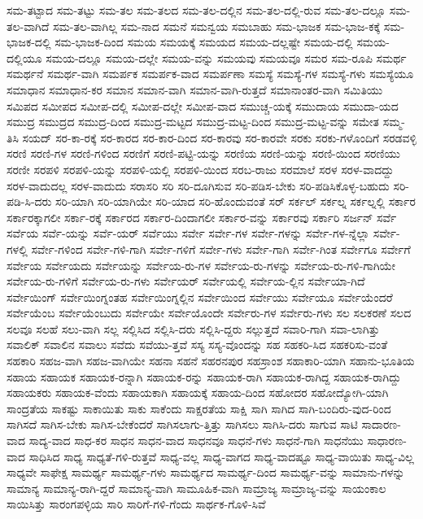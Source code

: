 {ಸಮ-ತಟ್ಟಾದ
ಸಮ-ತಟ್ಟು
ಸಮ-ತಲ
ಸಮ-ತಲದ
ಸಮ-ತಲ-ದಲ್ಲಿನ
ಸಮ-ತಲ-ದಲ್ಲಿ-ರುವ
ಸಮ-ತಲ-ದಲ್ಲೂ
ಸಮ-ತಲ-ವಾಗಿದೆ
ಸಮ-ತಲ-ವಾಗಿಲ್ಲ
ಸಮ-ನಾದ
ಸಮನೆ
ಸಮನ್ವಯ
ಸಮಬಾಹು
ಸಮ-ಭಾಜಕ
ಸಮ-ಭಾಜ-ಕಕ್ಕೆ
ಸಮ-ಭಾಜಕ-ದಲ್ಲಿ
ಸಮ-ಭಾಜಕ-ದಿಂದ
ಸಮಯ
ಸಮಯಕ್ಕೆ
ಸಮಯದ
ಸಮಯ-ದಲ್ಲಷ್ಟೇ
ಸಮಯ-ದಲ್ಲಿ
ಸಮಯ-ದಲ್ಲಿಯೂ
ಸಮಯ-ದಲ್ಲೂ
ಸಮಯ-ದಲ್ಲೇ
ಸಮಯ-ವನ್ನು
ಸಮಯವು
ಸಮಯವೂ
ಸಮರ
ಸಮ-ರೂಪಿ
ಸಮರ್ಥ
ಸಮರ್ಥನೆ
ಸಮರ್ಥ-ವಾಗಿ
ಸಮರ್ಪಕ
ಸಮರ್ಪಕ-ವಾದ
ಸಮರ್ಪಣಾ
ಸಮಸ್ಯೆ
ಸಮಸ್ಯೆ-ಗಳ
ಸಮಸ್ಯೆ-ಗಳು
ಸಮಸ್ಯೆಯೂ
ಸಮಾಧಾನ
ಸಮಾಧಾನ-ಕರ
ಸಮಾನ
ಸಮಾನ-ವಾಗಿ
ಸಮಾನ-ವಾಗಿ-ರುತ್ತದೆ
ಸಮಾನಾಂತರ-ವಾಗಿ
ಸಮಿತಿಯು
ಸಮಿಪದ
ಸಮೀಪದ
ಸಮೀಪ-ದಲ್ಲಿ
ಸಮೀಪ-ದಲ್ಲೇ
ಸಮೀಪ-ವಾದ
ಸಮುಚ್ಚ-ಯಕ್ಕೆ
ಸಮುದಾಯ
ಸಮುದಾ-ಯದ
ಸಮುದ್ರ
ಸಮುದ್ರದ
ಸಮುದ್ರ-ದಿಂದ
ಸಮುದ್ರ-ಮಟ್ಟದ
ಸಮುದ್ರ-ಮಟ್ಟ-ದಿಂದ
ಸಮುದ್ರ-ಮಟ್ಟ-ವನ್ನು
ಸಮೇತ
ಸಮ್ಮ-ತಿಸಿ
ಸಯದ್
ಸರ-ಕಾ-ರಕ್ಕೆ
ಸರ-ಕಾರದ
ಸರ-ಕಾರ-ದಿಂದ
ಸರ-ಕಾರವು
ಸರ-ಕಾರವೇ
ಸರಕು
ಸರಕು-ಗಳೊಂದಿಗೆ
ಸರಡವಳ್ಳಿ
ಸರಣಿ
ಸರಣಿ-ಗಳ
ಸರಣಿ-ಗಳಿಂದ
ಸರಣಿಗೆ
ಸರಣಿ-ಪಟ್ಟಿ-ಯನ್ನು
ಸರಣಿಯ
ಸರಣಿ-ಯನ್ನು
ಸರಣಿ-ಯಿಂದ
ಸರಣಿಯು
ಸರಣೀ
ಸರಪಳಿ
ಸರಪಳಿ-ಯನ್ನು
ಸರಪಳಿ-ಯಲ್ಲಿ
ಸರಪಳಿ-ಯಿಂದ
ಸರಬ-ರಾಜು
ಸರಮಾಲೆ
ಸರಳ
ಸರಳ-ವಾದದ್ದು
ಸರಳ-ವಾದುದಲ್ಲ
ಸರಳ-ವಾದುದು
ಸರಾಸರಿ
ಸರಿ
ಸರಿ-ದೂಗಿಸುವ
ಸರಿ-ಪಡಿಸ-ಬೇಕು
ಸರಿ-ಪಡಿಸಿಕೊಳ್ಳ-ಬಹುದು
ಸರಿ-ಪಡಿ-ಸಿ-ದರು
ಸರಿ-ಯಾಗಿ
ಸರಿ-ಯಾಗಿಯೇ
ಸರಿ-ಯಾದ
ಸರಿ-ಹೊಂದುವಂತೆ
ಸರ್
ಸರ್ಕಲ್
ಸರ್ಕಲ್ನ
ಸರ್ಕಲ್ನಲ್ಲಿ
ಸರ್ಕಾರ
ಸರ್ಕಾರಕ್ಕಾಗಲೀ
ಸರ್ಕಾ-ರಕ್ಕೆ
ಸರ್ಕಾರದ
ಸರ್ಕಾರ-ದಿಂದಾಗಲೀ
ಸರ್ಕಾರ-ವನ್ನು
ಸರ್ಕಾರವು
ಸರ್ಕಾರಿ
ಸರ್ಜನ್
ಸರ್ವೆ
ಸರ್ವೆಯ
ಸರ್ವೆ-ಯನ್ನು
ಸರ್ವೆ-ಯರ್
ಸರ್ವೆಯು
ಸರ್ವೇ
ಸರ್ವೇ-ಗಳ
ಸರ್ವೇ-ಗಳನ್ನು
ಸರ್ವೇ-ಗಳ-ನ್ನೆಲ್ಲಾ
ಸರ್ವೇ-ಗಳಲ್ಲಿ
ಸರ್ವೇ-ಗಳಿಂದ
ಸರ್ವೇ-ಗಳಿ-ಗಾಗಿ
ಸರ್ವೇ-ಗಳಿಗೆ
ಸರ್ವೇ-ಗಳು
ಸರ್ವೇ-ಗಾಗಿ
ಸರ್ವೇ-ಗಿಂತ
ಸರ್ವೇಗೂ
ಸರ್ವೇಗೆ
ಸರ್ವೇಯ
ಸರ್ವೇಯದು
ಸರ್ವೇಯನ್ನು
ಸರ್ವೇಯ-ರು-ಗಳ
ಸರ್ವೇಯ-ರು-ಗಳನ್ನು
ಸರ್ವೇಯ-ರು-ಗಳಿ-ಗಾಗಿಯೇ
ಸರ್ವೇಯ-ರು-ಗಳಿಗೆ
ಸರ್ವೇಯ-ರು-ಗಳು
ಸರ್ವೇಯರ್
ಸರ್ವೇಯಲ್ಲಿ
ಸರ್ವೇಯ-ಲ್ಲಿನ
ಸರ್ವೇಯಾ-ಗಿದೆ
ಸರ್ವೇಯಿಂಗ್
ಸರ್ವೇಯಿಂಗ್ನಂತಹ
ಸರ್ವೇಯಿಂಗ್ನಲ್ಲಿನ
ಸರ್ವೇಯಿಂದ
ಸರ್ವೇಯು
ಸರ್ವೇಯೂ
ಸರ್ವೇಯೆಂದರೆ
ಸರ್ವೇಯೆಂಬ
ಸರ್ವೇಯೆಂಬುದು
ಸರ್ವೇಯೇ
ಸರ್ವೇಯೊಂದೇ
ಸರ್ವೇರು-ಗಳ
ಸರ್ವೇರು-ಗಳು
ಸಲ
ಸಲಕರಣೆ
ಸಲದ
ಸಲವೂ
ಸಲಹೆ
ಸಲು-ವಾಗಿ
ಸಲ್ಲ
ಸಲ್ಲಿಸಿದ
ಸಲ್ಲಿಸಿ-ದರು
ಸಲ್ಲಿಸಿ-ದ್ದರು
ಸಲ್ಲುತ್ತದೆ
ಸವಾರಿ-ಗಾಗಿ
ಸವಾ-ಲಾಗಿತ್ತು
ಸವಾಲಿಕ್
ಸವಾಲಿನ
ಸವಾಲು
ಸವೆದು
ಸವೆಯು-ತ್ತವೆ
ಸಸ್ಯ
ಸಸ್ಯ-ವೊಂದನ್ನು
ಸಹ
ಸಹಕರಿ-ಸಿದ
ಸಹಕರಿಸು-ವಂತೆ
ಸಹಕಾರಿ
ಸಹಜ-ವಾಗಿ
ಸಹಜ-ವಾಗಿಯೇ
ಸಹನಾ
ಸಹನೆ
ಸಹರನಪುರ
ಸಹಸ್ರಾಂಶ
ಸಹಾಕಾರಿ-ಯಾಗಿ
ಸಹಾನು-ಭೂತಿಯ
ಸಹಾಯ
ಸಹಾಯಕ
ಸಹಾಯಕ-ರನ್ನಾಗಿ
ಸಹಾಯಕ-ರನ್ನು
ಸಹಾಯಕ-ರಾಗಿ
ಸಹಾಯಕ-ರಾಗಿದ್ದ
ಸಹಾಯಕ-ರಾಗಿದ್ದು
ಸಹಾಯಕರು
ಸಹಾಯಕ-ವೆಂದು
ಸಹಾಯಕಾಗಿ
ಸಹಾಯಕ್ಕೆ
ಸಹಾಯ-ದಿಂದ
ಸಹೋದರ
ಸಹೋದ್ಯೋಗಿ-ಯಾಗಿ
ಸಾಂದ್ರತೆಯ
ಸಾಕಷ್ಟು
ಸಾಕಾಯಿತು
ಸಾಕು
ಸಾಕೆಂದು
ಸಾಕ್ಷರತೆಯ
ಸಾಕ್ಷಿ
ಸಾಗಿ
ಸಾಗಿದ
ಸಾಗಿ-ಬಂದಿರು-ವುದ-ರಿಂದ
ಸಾಗಿಸದೆ
ಸಾಗಿಸ-ಬೇಕು
ಸಾಗಿಸ-ಬೇಕೆಂದರೆ
ಸಾಗಿಸಲಾಗು-ತ್ತಿತ್ತು
ಸಾಗಿಸಲು
ಸಾಗಿಸಿ-ದರು
ಸಾಗುವ
ಸಾಟಿ
ಸಾದಾರಣ-ವಾದ
ಸಾದ್ಯ-ವಾದ
ಸಾಧ-ಕರ
ಸಾಧನ
ಸಾಧನ-ವಾದ
ಸಾಧನವೂ
ಸಾಧನೆ-ಗಳು
ಸಾಧನೆ-ಗಾಗಿ
ಸಾಧನೆಯು
ಸಾಧಾರಣ-ವಾದ
ಸಾಧಿಸಿದ
ಸಾಧ್ಯ
ಸಾಧ್ಯತೆ-ಗಳಿ-ರುತ್ತವೆ
ಸಾಧ್ಯ-ವಲ್ಲ
ಸಾಧ್ಯ-ವಾಗದ
ಸಾಧ್ಯ-ವಾದಷ್ಟೂ
ಸಾಧ್ಯ-ವಾಯಿತು
ಸಾಧ್ಯ-ವಿಲ್ಲ
ಸಾಧ್ಯವೇ
ಸಾಫೇಕ್ಷ
ಸಾಮರ್ಥ್ಯ
ಸಾಮರ್ಥ್ಯ-ಗಳು
ಸಾಮರ್ಥ್ಯದ
ಸಾಮರ್ಥ್ಯ-ದಿಂದ
ಸಾಮರ್ಥ್ಯ-ವನ್ನು
ಸಾಮಾನು-ಗಳನ್ನು
ಸಾಮಾನ್ಯ
ಸಾಮಾನ್ಯ-ರಾಗಿ-ದ್ದರೆ
ಸಾಮಾನ್ಯ-ವಾಗಿ
ಸಾಮೂಹಿಕ-ವಾಗಿ
ಸಾಮ್ರಾಜ್ಯ
ಸಾಮ್ರಾಜ್ಯ-ವನ್ನು
ಸಾಯಂಕಾಲ
ಸಾಯಿಸಿತ್ತು
ಸಾರಂಗಪಳ್ಳಿಯ
ಸಾರಿ
ಸಾರಿಗೆ-ಗಳಿ-ಗೆಂದು
ಸಾರ್ಥಕ-ಗೊಳಿ-ಸಿವೆ
}
